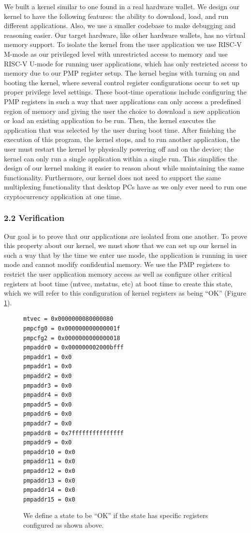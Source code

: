 \documentclass[]{article}
\begin{document}
We built a kernel similar to one found in a real hardware wallet. We design our kernel to have the following features: the ability to download, load, and run different applications. Also, we use a smaller codebase to make debugging and reasoning easier. Our target hardware, like other hardware wallets, has no virtual memory support. To isolate the kernel from the user application we use RISC-V M-mode as our privileged level with unrestricted access to memory and use RISC-V U-mode for running user applications, which has only restricted access to memory due to our PMP register setup. The kernel begins with turning on and booting the kernel, where several control register configurations occur to set up proper privilege level settings. These boot-time operations include configuring the PMP registers in such a way that user applications can only access a predefined region of memory and giving the user the choice to download a new application or load an existing application to be run. Then, the kernel executes the application that was selected by the user during boot time. After finishing the execution of this program, the kernel stops, and to run another application, the user must restart the kernel by physically powering off and on the device; the kernel can only run a single application within a single run. This simplifies the design of our kernel making it easier to reason about while maintaining the same functionality. Furthermore, our kernel does not need to support the same multiplexing functionality that desktop PCs have as we only ever need to run one cryptocurrency application at one time.

\subsubsection{2.2 Verification}\label{verification}

Our goal is to prove that our applications are isolated from one another. To prove this property about our kernel, we must show that we can set up our kernel in such a way that by the time we enter use mode, the application is running in user mode and cannot modify confidential memory. We use the PMP registers to restrict the user application memory access as well as configure other critical registers at boot time (mtvec, mstatus, etc) at boot time to create this state, which we will refer to this configuration of kernel registers as being ``OK'' (Figure \ref{fig:figure2}).

\begin{figure}
\centering
\begin{verbatim}
mtvec = 0x0000000080000080
pmpcfg0 = 0x000000000000001f
pmpcfg2 = 0x0000000000000018
pmpaddr0 = 0x000000002000bfff
pmpaddr1 = 0x0
pmpaddr1 = 0x0
pmpaddr2 = 0x0
pmpaddr3 = 0x0
pmpaddr4 = 0x0
pmpaddr5 = 0x0
pmpaddr6 = 0x0
pmpaddr7 = 0x0
pmpaddr8 = 0x7fffffffffffffff
pmpaddr9 = 0x0
pmpaddr10 = 0x0
pmpaddr11 = 0x0
pmpaddr12 = 0x0
pmpaddr13 = 0x0
pmpaddr14 = 0x0
pmpaddr15 = 0x0
\end{verbatim}
\caption{We define a state to be ``OK'' if the state has
specific registers configured as shown above.}
\label{fig:figure2}
\end{figure}
\end{document}
